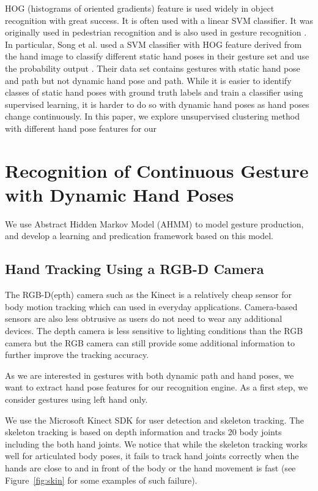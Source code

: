 \documentclass{sig-alternate}
\begin{document}
HOG (histograms of oriented gradients) feature \cite{dalal05} is used widely
in object recognition with great success. It is often used with a linear SVM
classifier. It was originally used in pedestrian recognition and is also used in 
gesture recognition \cite{song12}. In particular, Song et al. used a SVM
classifier with HOG feature derived from the hand image to classify different
static hand poses in their gesture set and use the probability output . Their
data set contains gestures with static hand pose and path but not dynamic hand pose and path. While it is easier
to identify classes of static hand poses with ground truth labels and train a
classifier using supervised learning, it is harder to do so with dynamic hand
poses as hand poses change continuously. In this paper, we explore unsupervised
clustering method with different hand pose features for our 


\section{Recognition of Continuous Gesture with Dynamic Hand Poses}
We use Abstract Hidden Markov Model (AHMM) to model gesture production, and
develop a learning and predication framework based on this model.

\subsection{Hand Tracking Using a RGB-D Camera}
The RGB-D(epth) camera such as the Kinect is a relatively cheap sensor for 
body motion tracking which can used in everyday applications. Camera-based
sensors are also less obtrusive as users do not need to wear any additional
devices. The depth camera is less sensitive to lighting conditions than the RGB
camera but the RGB camera can still provide some additional information to
further improve the tracking accuracy.

As we are interested in gestures with both dynamic path and hand poses, we want
to extract hand pose features for our recognition engine. As a first step, we
consider gestures using left hand only.

We use the Microsoft Kinect SDK for user detection and skeleton tracking. The
skeleton tracking is based on depth information and tracks 20 body joints
including the both hand joints.
We notice that while the skeleton tracking works well for articulated body poses,
it fails to track hand joints correctly when the hands are close to and in
front of the body or the hand movement is fast (see Figure~\ref{fig:skin} for
some examples of such failure).
\end{document}
